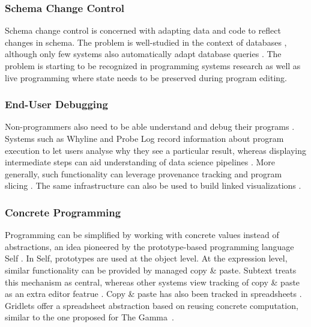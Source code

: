 \documentclass[sigconf,anonymous,screen]{acmart}
\begin{document}
\subsubsection*{Schema Change Control}
Schema change control is concerned with adapting data and code to reflect changes in schema.
The problem is well-studied in the context of databases \cite{brahmia-2024-evolution},
although only few systems also automatically adapt database queries \cite{wang-2019-schema}.
The problem is starting to be recognized in programming systems research
\cite{litt-2020-cambria,edwards-2025-schema} as well as live programming \cite{barenz-2020-live}
where state needs to be preserved during program editing.

\subsubsection*{End-User Debugging}
Non-programmers also need to be able understand and debug their programs \cite{kissinger-2006-debugging}.
Systems such as Whyline and Probe Log \cite{ko-2004-whyline,ko-2009-whyline,krebs-2023-probelog}
record information about program execution to let users analyse why they see a particular result,
whereas displaying intermediate steps can aid understanding of data science pipelines \cite{shrestha-2021-unravel}.
More generally, such functionality can leverage provenance tracking \cite{cheney-2009-provenance}
and program slicing \cite{ricciotti-2017-imperative,perera-2012-functional}. The same infrastructure
can also be used to build linked visualizations \cite{perera-2022-linked}.

\subsubsection*{Concrete Programming}
Programming can be simplified by working with concrete values instead of abstractions, an idea
pioneered by the prototype-based programming language Self \cite{ungar-1987-self}. In Self,
prototypes are used at the object level. At the expression level, similar functionality can be provided
by managed copy \& paste. Subtext \cite{edwards-2006-copypaste,edwards-2022-copypaste} treats this
mechanism as central, whereas other systems view tracking of copy \& paste as an extra
editor featrue \cite{jablonski-2007-cren,toomim-2004-linked}. Copy \& paste has also been
tracked in spreadsheets \cite{hermans-2015-copypaste}. Gridlets \cite{joharizadeh-2020-gridlets}
offer a spreadsheet abstraction based on reusing concrete computation, similar to the one proposed
for The Gamma~\cite{petricek-2020-live}.
\end{document}
